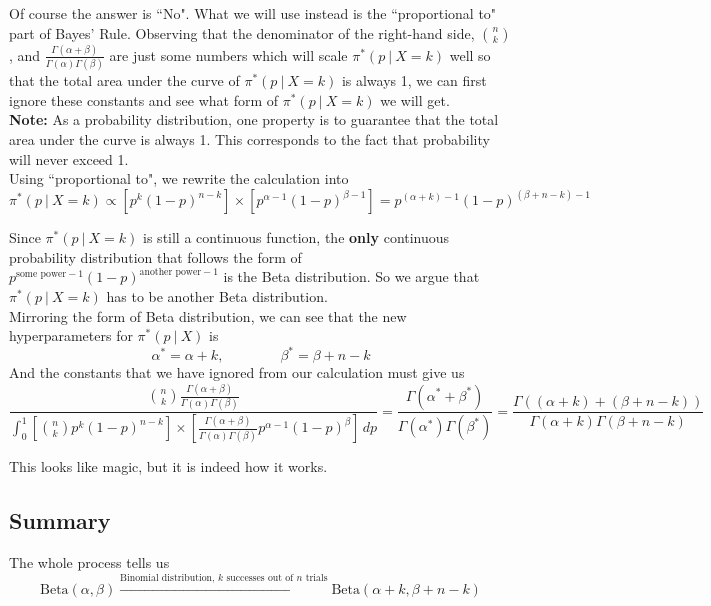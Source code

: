 \documentclass{article}
\def\dsst{\displaystyle}
\begin{document}
Of course the answer is ``No". What we will use instead is the ``proportional to" part of Bayes' Rule. Observing that the denominator of the right-hand side, $\dsst \binom{n}{k}$, and $\dsst \frac{\Gamma(\alpha+\beta)}{\Gamma(\alpha)\Gamma(\beta)}$ are just some numbers which will scale $\pi^*(p~|~X=k)$ well so that the total area under the curve of $\pi^*(p~|~X=k)$ is always 1, we can first ignore these constants and see what form of $\pi^*(p~|~X=k)$ we will get.\\

\textbf{Note:} As a probability distribution, one property is to guarantee that the total area under the curve is always 1. This corresponds to the fact that probability will never exceed 1.\\
 
Using ``proportional to", we rewrite the calculation into
$$ \pi^*(p~|~X=k) \propto \left[p^k(1-p)^{n-k}\right]\times \left[p^{\alpha-1}(1-p)^{\beta-1}\right] = p^{(\alpha+k)-1}(1-p)^{(\beta+n-k)-1} $$

Since $\pi^*(p~|~X=k)$ is still a continuous function, the \textbf{only} continuous probability distribution that follows the form of $p^{\text{some power}-1}(1-p)^{\text{another power}-1}$ is the Beta distribution. So we argue that $\pi^*(p~|~X=k)$ has to be another Beta distribution. \\

Mirroring the form of Beta distribution, we can see that the new hyperparameters for $\pi^*(p~|~X)$ is 
$$ \alpha^* = \alpha + k,\qquad \qquad \beta^* = \beta + n -k $$
And the constants that we have ignored from our calculation must give us
$$ \frac{\dsst \binom{n}{k}\frac{\Gamma(\alpha+\beta)}{\Gamma(\alpha)\Gamma(\beta)}}{\dsst \int_0^1 \left[\binom{n}{k}p^k(1-p)^{n-k}\right]\times \left[\frac{\Gamma(\alpha+\beta)}{\Gamma(\alpha)\Gamma(\beta)}p^{\alpha-1}(1-p)^{\beta}\right]\, dp} = \frac{\Gamma(\alpha^*+\beta^*)}{\Gamma(\alpha^*)\Gamma(\beta^*)}= \frac{\Gamma((\alpha+k)+(\beta+n-k))}{\Gamma(\alpha+k)\Gamma(\beta+n-k)} $$

This looks like magic, but it is indeed how it works. 

\subsection{Summary}

The whole process tells us
$$ \text{Beta}(\alpha, \beta) \xrightarrow{\text{Binomial distribution, $k$ successes out of $n$ trials}} \text{Beta}(\alpha+k, \beta+n-k) $$
\end{document}
